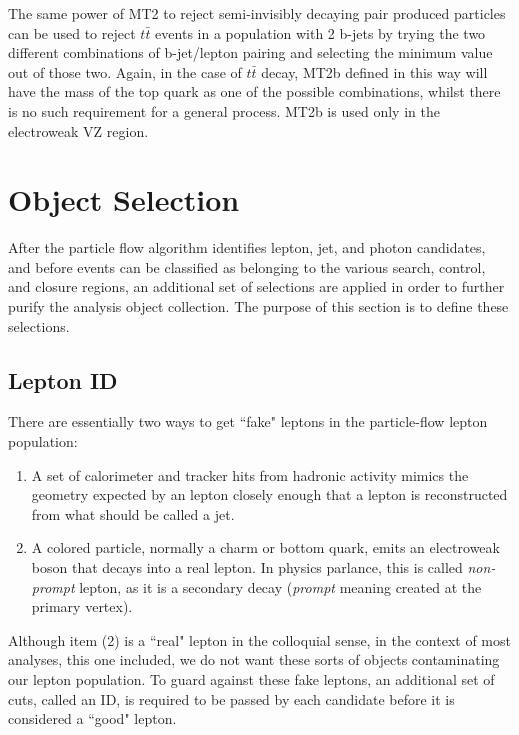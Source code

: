       The same power of MT2 to reject semi-invisibly decaying pair produced particles can be used to reject $t\bar{t}$ events in a population with 2 b-jets by trying the two different combinations of b-jet/lepton pairing and selecting the minimum value out of those two. Again, in the case of $t\bar{t}$ decay, MT2b defined in this way will have the mass of the top quark as one of the possible combinations, whilst there is no such requirement for a general process. MT2b is used only in the electroweak VZ region.

\section{Object Selection}


  After the particle flow algorithm identifies lepton, jet, and photon candidates, and before events can be classified as belonging to the various search, control, and closure regions, an additional set of selections are applied in order to further purify the analysis object collection. The purpose of this section is to define these selections.

  \subsection{Lepton ID}
    There are essentially two ways to get ``fake" leptons in the particle-flow lepton population:

    \begin{enumerate}
      \item A set of calorimeter and tracker hits from hadronic activity mimics the geometry expected by an lepton closely enough that a lepton is reconstructed from what should be called a jet.
      \item A colored particle, normally a charm or bottom quark, emits an electroweak boson that decays into a real lepton. In physics parlance, this is called \emph{non-prompt} lepton, as it is a secondary decay (\emph{prompt} meaning created at the primary vertex).
    \end{enumerate}

    Although item (2) is a ``real" lepton in the colloquial sense, in the context of most analyses, this one included, we do not want these sorts of objects contaminating our lepton population. To guard against these fake leptons, an additional set of cuts, called an ID, is required to be passed by each candidate before it is considered a ``good" lepton.


